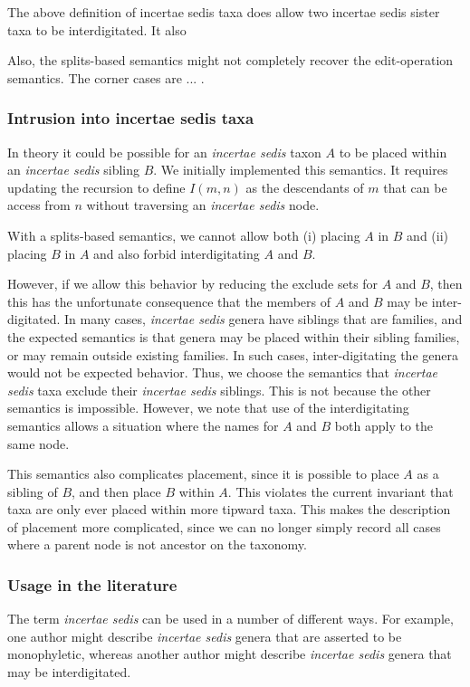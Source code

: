 \documentclass[english]{article}
\begin{document}
The above definition of incertae sedis taxa does allow two incertae
sedis sister taxa to be interdigitated. It also

Also, the splits-based semantics might not completely recover the
edit-operation semantics. The corner cases are ... .

\subsubsection{Intrusion into incertae sedis taxa}

In theory it could be possible for an \emph{incertae sedis} taxon $A$
to be placed within an \emph{incertae sedis} sibling $B$. We initially
implemented this semantics. It requires updating the recursion to
define $I(m,n)$ as the descendants of $m$ that can be access from $n$
without traversing an \emph{incertae sedis} node.

With a splits-based semantics, we cannot allow both (i) placing $A$ in
$B$ and (ii) placing $B$ in $A$ and also forbid interdigitating $A$
and $B$.

However, if we allow this behavior by reducing the exclude sets for
$A$ and $B$, then this has the unfortunate consequence that the
members of $A$ and $B$ may be inter-digitated. In many cases,
\emph{incertae sedis} genera have siblings that are families, and the
expected semantics is that genera may be placed within their sibling
families, or may remain outside existing families. In such cases,
inter-digitating the genera would not be expected behavior. Thus, we
choose the semantics that \emph{incertae sedis} taxa exclude their
\emph{incertae sedis} siblings. This is not because the other
semantics is impossible. However, we note that use of the
interdigitating semantics allows a situation where the names for $A$
and $B$ both apply to the same node.

This semantics also complicates placement, since it is possible to
place $A$ as a sibling of $B$, and then place $B$ within $A$. This
violates the current invariant that taxa are only ever placed within
more tipward taxa. This makes the description of placement more
complicated, since we can no longer simply record all cases where a
parent node is not ancestor on the taxonomy.

\subsubsection{Usage in the literature}

The term \emph{incertae sedis} can be used in a number of different
ways. For example,\emph{ }one author might describe \emph{incertae
sedis} genera that are asserted to be monophyletic, whereas another
author might describe \emph{incertae sedis} genera that may be
interdigitated.



\end{document}
